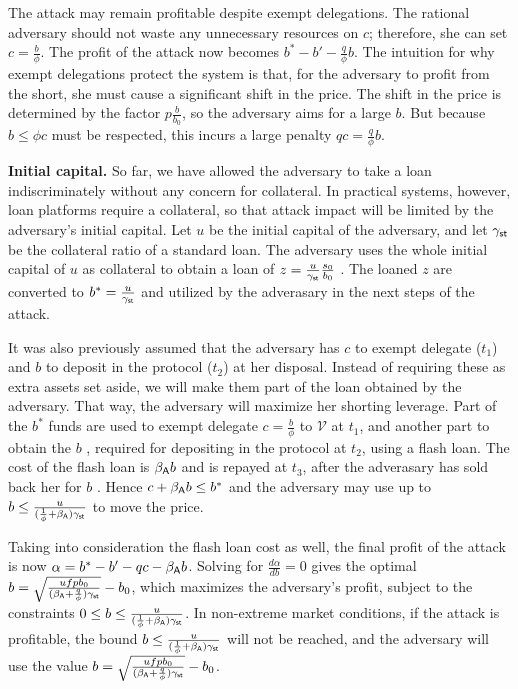 The attack may remain profitable despite exempt delegations.
The rational adversary should not waste any unnecessary resources on
$c$; therefore, she can set $c = \frac{b}{\phi}$. The profit of the attack now
becomes $b^* - b' - \frac{q}{\phi}b$.
The intuition for why exempt delegations protect the system is that,
for the adversary to profit from the short, she must cause a significant
shift in the price. The shift in the price is determined by the factor
$p\frac{b}{b_0}$, so the adversary aims for a large $b$. But because $b \leq \phi c$
must be respected, this incurs a large penalty $qc = \frac{q}{\phi}b$.

\noindent
\textbf{Initial capital.}
So far, we have allowed the adversary to take a loan indiscriminately without
any concern for collateral. In practical systems, however, loan platforms
require a collateral, so that attack impact will be limited by the adversary's
initial capital. Let $u$ \asset be the initial capital of the adversary, and
let $\gamma_{\textsf{st}}$ be the collateral ratio of a standard \stasset
loan. The adversary uses the whole initial capital of $u$ \asset as
collateral to obtain a loan of $z = \frac{u}{\gamma_{\textsf{st}}} \frac{s_0}{b_0}$ \stasset.
The loaned $z$ \stasset are converted to $b^*=\frac{u}{\gamma_{\textsf{st}}}$ \asset
and utilized by the adverasary in the next steps of the attack.

It was also previously assumed that the adversary has $c$ \asset to exempt
delegate ($t_1$) and $b$ \asset to deposit in the protocol ($t_2$) at her disposal.
Instead of requiring these as extra assets set aside, we will make them part of
the loan obtained by the adversary. That way, the adversary will maximize her
shorting leverage.
Part of the $b^*$ funds are used to exempt delegate $c = \frac{b}{\phi}$ \asset
to $\mathcal{V}$ at $t_1$, and another part to obtain the $b$ \asset, required for depositing in
the protocol at $t_2$, using a flash loan.  The cost of the flash loan is $\beta_{\textsf{A}} b$ and is repayed at $t_3$,
after the adverasary has sold back her \stasset for $b$ \asset.
Hence $c + \beta_{\textsf{A}} b \leq b^*$ and the adversary may use up to
$b \leq \frac{u}{(\frac{1}{\phi} + \beta_{\textsf{A}})\gamma_{\textsf{st}}}$
to move the price.

Taking into consideration the flash loan cost as well, the final profit of the attack is now
$\alpha = b^* - b' - qc - \beta_{\textsf{A}} b$.
Solving for $\frac{d\alpha}{db} = 0$ gives the optimal $b = \sqrt{\frac{u f p b_0}{(\beta_{\textsf{A}} + \frac{q}{\phi})\gamma_{\textsf{st}}}} - b_0$,
which maximizes
the adversary's profit, subject to the constraints
$0 \leq b \leq \frac{u}{(\frac{1}{\phi} + \beta_{\textsf{A}}) \gamma_{\textsf{st}}}$.
In non-extreme market conditions, if the attack is profitable, the bound
$b \leq \frac{u}{(\frac{1}{\phi} + \beta_{\textsf{A}})\gamma_{\textsf{st}}}$ will not be reached,
and the adversary will use the value
$b = \sqrt{\frac{u f p b_0}{(\beta_{\textsf{A}} + \frac{q}{\phi})\gamma_{\textsf{st}}}} - b_0$.

